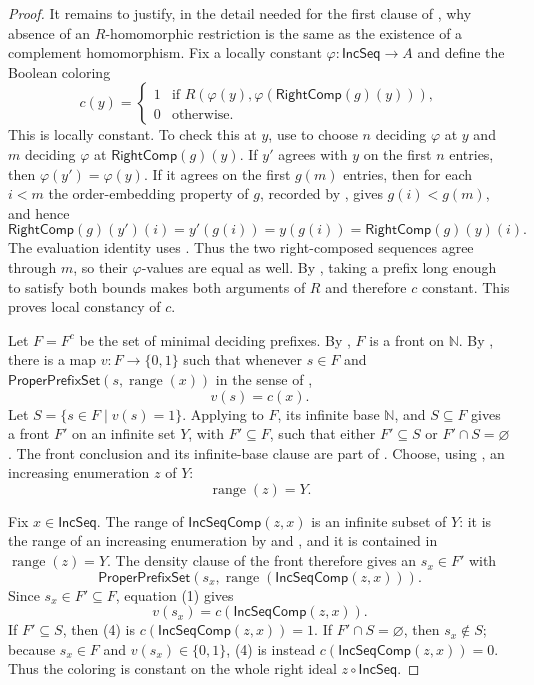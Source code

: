 \begin{proof}
It remains to justify, in the detail needed for the first clause of
, why absence of an $R$-homomorphic restriction is the
same as the existence of a complement homomorphism.  Fix a locally constant
$\varphi:\mathsf{IncSeq}\to A$ and define the Boolean coloring
\[
c(y)=
\begin{cases}
1&\text{if }R(\varphi(y),\varphi(\mathsf{RightComp}(g)(y))),\\
0&\text{otherwise.}
\end{cases}
\]
This is locally constant.  To check this at $y$, use
 to choose $n$ deciding $\varphi$ at $y$ and $m$
deciding $\varphi$ at $\mathsf{RightComp}(g)(y)$.  If $y'$ agrees with $y$
on the first $n$ entries, then $\varphi(y')=\varphi(y)$.  If it agrees on
the first $g(m)$ entries, then for each $i<m$ the order-embedding property
of $g$, recorded by , gives $g(i)<g(m)$, and hence
\[
\mathsf{RightComp}(g)(y')(i)=y'(g(i))=y(g(i))
 =\mathsf{RightComp}(g)(y)(i).
\]
The evaluation identity uses .  Thus the two
right-composed sequences agree through $m$, so their
$\varphi$-values are equal as well.  By , taking a
prefix long enough to satisfy both bounds makes both arguments of $R$ and
therefore $c$ constant.  This proves local constancy of $c$.

Let $F=F^c$ be the set of minimal deciding prefixes.  By
, $F$ is a front on $\mathbb N$.  By
, there is a map
$v:F\to\{0,1\}$ such that whenever $s\in F$ and
$\mathsf{ProperPrefixSet}(s,\operatorname{range}(x))$ in the sense of
,
\[
v(s)=c(x). \tag{1}
\]
Let $S=\{s\in F\mid v(s)=1\}$.  Applying  to
$F$, its infinite base $\mathbb N$, and $S\subseteq F$ gives a front $F'$ on
an infinite set $Y$, with $F'\subseteq F$, such that either
$F'\subseteq S$ or $F'\cap S=\varnothing$.  The front conclusion and its
infinite-base clause are part of .  Choose, using
, an increasing enumeration $z$ of $Y$:
\[
\operatorname{range}(z)=Y. \tag{2}
\]

Fix $x\in\mathsf{IncSeq}$.  The range of
$\mathsf{IncSeqComp}(z,x)$ is an infinite subset of $Y$: it is the range of
an increasing enumeration by  and , and
it is contained in $\operatorname{range}(z)=Y$.  The density clause of the
front  therefore gives an $s_x\in F'$ with
\[
\mathsf{ProperPrefixSet}(s_x,
  \operatorname{range}(\mathsf{IncSeqComp}(z,x))). \tag{3}
\]
Since $s_x\in F'\subseteq F$, equation (1) gives
\[
v(s_x)=c(\mathsf{IncSeqComp}(z,x)). \tag{4}
\]
If $F'\subseteq S$, then (4) is $c(\mathsf{IncSeqComp}(z,x))=1$.
If $F'\cap S=\varnothing$, then $s_x\notin S$; because $s_x\in F$ and
$v(s_x)\in\{0,1\}$, (4) is instead
$c(\mathsf{IncSeqComp}(z,x))=0$.  Thus the coloring is constant on the
whole right ideal $z\circ\mathsf{IncSeq}$.


\end{proof}
